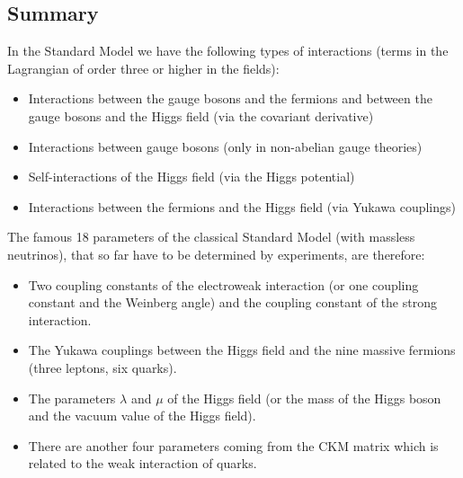 \documentclass[12pt]{amsart}
\theoremstyle{definition}
\theoremstyle{remark}
\numberwithin{equation}{section}
\begin{document}
\subsection{Summary}
In the Standard Model we have the following types of interactions (terms in the Lagrangian of order three or higher in the fields):
\begin{itemize}
\item Interactions between the gauge bosons and the fermions and between the gauge bosons and the Higgs field (via the covariant derivative)
\item Interactions between gauge bosons (only in non-abelian gauge theories)
\item Self-interactions of the Higgs field (via the Higgs potential)
\item Interactions between the fermions and the Higgs field (via Yukawa couplings)
\end{itemize}
The famous 18 parameters of the classical Standard Model (with massless neutrinos), that so far have to be determined by experiments, are therefore:
\begin{itemize}
\item Two coupling constants of the electroweak interaction (or one coupling constant and the Weinberg angle) and the coupling constant of the strong interaction.
\item The Yukawa couplings between the Higgs field and the nine massive fermions (three leptons, six quarks).
\item The parameters $\lambda$ and $\mu$ of the Higgs field (or the mass of the Higgs boson and the vacuum value of the Higgs field).
\item There are another four parameters coming from the CKM matrix which is related to the weak interaction of quarks.
\end{itemize}
\end{document}
